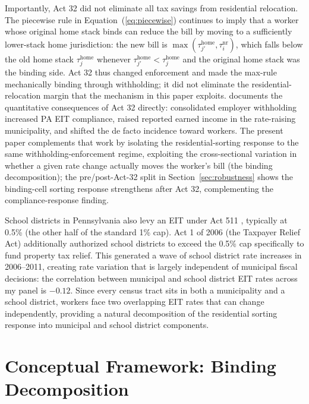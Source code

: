\documentclass[12pt]{article}
\begin{document}
Importantly, Act 32 did not eliminate all tax savings from
residential relocation. The piecewise rule in
Equation~(\ref{eq:piecewise}) continues to imply that a worker whose
original home stack binds can reduce the bill by moving to a
sufficiently lower-stack home jurisdiction: the new bill is
$\max(\tau^{\text{home}}_{j'}, \tau^{\text{nr}}_i)$, which falls
below the old home stack $\tau^{\text{home}}_j$ whenever
$\tau^{\text{home}}_{j'} < \tau^{\text{home}}_j$ and the original
home stack was the binding side. Act 32 thus changed enforcement
and made the max-rule mechanically binding through withholding; it
did not eliminate the residential-relocation margin that the
mechanism in this paper exploits.
\citet{bagchiEffectsIntroducingWithholding2022} documents the
quantitative consequences of Act 32 directly: consolidated employer
withholding increased PA EIT compliance, raised reported earned
income in the rate-raising municipality, and shifted the de facto incidence
toward workers. The present paper complements that work by isolating
the residential-sorting response to the same withholding-enforcement
regime, exploiting the cross-sectional variation in whether a given
rate change actually moves the worker's bill (the binding
decomposition); the pre/post-Act-32 split in
Section~\ref{sec:robustness} shows the binding-cell sorting
response strengthens after Act 32, complementing the
compliance-response finding.

School districts in Pennsylvania also levy an EIT under Act 511
\citep{paAct511_1965}, typically at 0.5\% (the other half of the
standard 1\% cap). Act 1 of 2006 \citep{paAct1_2006} (the Taxpayer
Relief Act) additionally authorized
school districts to exceed the 0.5\% cap specifically to fund
property tax relief. This generated a wave of school district
rate increases in 2006--2011, creating rate variation that is
largely independent of municipal fiscal decisions: the correlation
between municipal and school district EIT rates across my panel
is $-0.12$. Since every census tract sits in both a municipality
and a school district, workers face two overlapping EIT rates
that can change independently, providing a natural decomposition
of the residential sorting response into municipal and school
district components.

\section{Conceptual Framework: Binding Decomposition}
\label{sec:theory}
\end{document}
